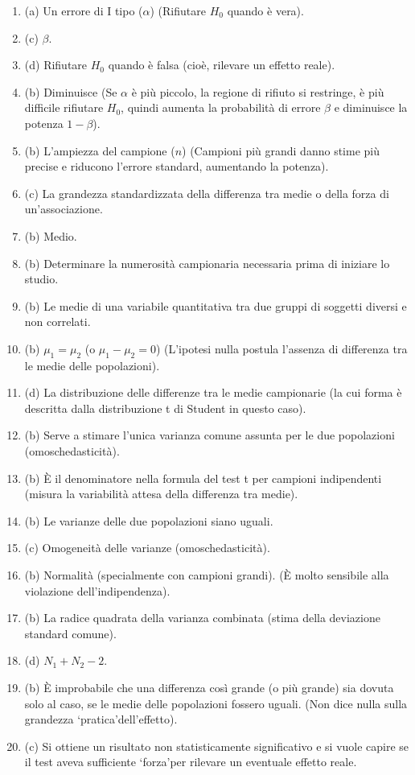 \documentclass[12pt, a4paper]{article}
\newcommand{\alphaerr}{\alpha} %
\newcommand{\betaerr}{\beta}  %
\newcommand{\Hnull}{H_0} %
\begin{document}
\begin{enumerate}[leftmargin=*, label=\arabic*.]
    \item (a) Un errore di I tipo ($\alphaerr$) (Rifiutare $\Hnull$ quando è vera).
    \item (c) $\betaerr$.
    \item (d) Rifiutare $\Hnull$ quando è falsa (cioè, rilevare un effetto reale).
    \item (b) Diminuisce (Se $\alphaerr$ è più piccolo, la regione di rifiuto si restringe, è più difficile rifiutare $\Hnull$, quindi aumenta la probabilità di errore $\betaerr$ e diminuisce la potenza $1-\betaerr$).
    \item (b) L'ampiezza del campione ($n$) (Campioni più grandi danno stime più precise e riducono l'errore standard, aumentando la potenza).
    \item (c) La grandezza standardizzata della differenza tra medie o della forza di un'associazione.
    \item (b) Medio.
    \item (b) Determinare la numerosità campionaria necessaria prima di iniziare lo studio.
    \item (b) Le medie di una variabile quantitativa tra due gruppi di soggetti diversi e non correlati.
    \item (b) $\mu_1 = \mu_2$ (o $\mu_1 - \mu_2 = 0$) (L'ipotesi nulla postula l'assenza di differenza tra le medie delle popolazioni).
    \item (d) La distribuzione delle differenze tra le medie campionarie (la cui forma è descritta dalla distribuzione t di Student in questo caso).
    \item (b) Serve a stimare l'unica varianza comune assunta per le due popolazioni (omoschedasticità).
    \item (b) È il denominatore nella formula del test t per campioni indipendenti (misura la variabilità attesa della differenza tra medie).
    \item (b) Le varianze delle due popolazioni siano uguali.
    \item (c) Omogeneità delle varianze (omoschedasticità).
    \item (b) Normalità (specialmente con campioni grandi). (È molto sensibile alla violazione dell'indipendenza).
    \item (b) La radice quadrata della varianza combinata (stima della deviazione standard comune).
    \item (d) $N_1 + N_2 - 2$.
    \item (b) È improbabile che una differenza così grande (o più grande) sia dovuta solo al caso, se le medie delle popolazioni fossero uguali. (Non dice nulla sulla grandezza   `pratica'dell'effetto).
    \item (c) Si ottiene un risultato non statisticamente significativo e si vuole capire se il test aveva sufficiente   `forza'per rilevare un eventuale effetto reale.
\end{enumerate}
\end{document}
